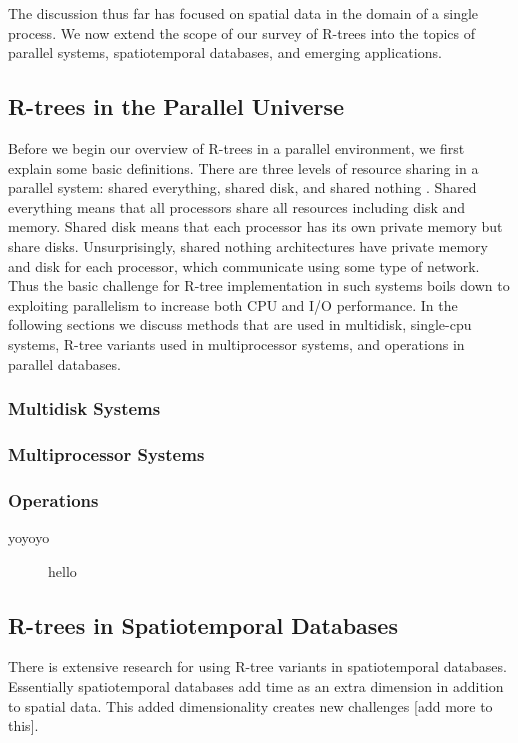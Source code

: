 The discussion thus far has focused on spatial data in the domain of a single
process. We now extend the scope of our survey of R-trees into the topics of
parallel systems, spatiotemporal databases, and emerging applications.

\subsection{R-trees in the Parallel Universe}
Before we begin our overview of R-trees in a parallel environment, we first 
explain some basic definitions. There are three levels of resource sharing in
a parallel system: shared everything, shared disk, and shared nothing
\cite{thebook}. Shared everything means that all processors share all 
resources including disk and memory. Shared disk means that each processor 
has its own private memory but share disks. Unsurprisingly, shared nothing 
architectures have private memory and disk for each processor, which
communicate using some type of network. Thus the basic challenge for R-tree 
implementation in such systems boils down to exploiting parallelism to 
increase both CPU and I/O performance. In the following sections we discuss
methods that are used in multidisk, single-cpu systems, R-tree variants used 
in multiprocessor systems, and operations in parallel databases.

\subsubsection{Multidisk Systems}

\subsubsection{Multiprocessor Systems}

\subsubsection{Operations}

\begin{description}
	\item[yoyoyo] hello
\end{description}

\subsection{R-trees in Spatiotemporal Databases}
There is extensive research for using R-tree variants in spatiotemporal
databases. Essentially spatiotemporal databases add time as an extra dimension
in addition to spatial data. This added dimensionality creates new challenges
[add more to this]. 

